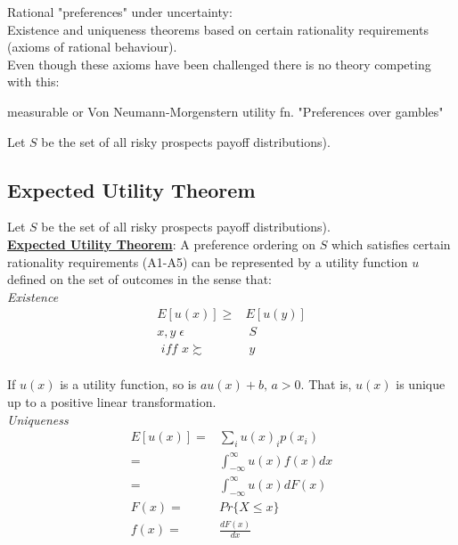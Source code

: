\documentclass[
14pt,notheorems,hyperref={pdfauthor=whatever}
]{beamer}
\begin{document}
\begin{frame}
Rational "preferences" under uncertainty:\\
\hfill \break
Existence and uniqueness theorems based on certain rationality requirements (axioms of rational behaviour).\\
\hfill \break
Even though these axioms have been challenged there is no theory competing with this:\\
\begin{outline}
    \1 measurable or Von Neumann-Morgenstern utility fn.
      \2 "Preferences over gambles"
\end{outline}
\hfill \break
Let $S$ be the set of all risky prospects  payoff distributions).\\
\end{frame}

\subsection{Expected Utility Theorem}

\begin{frame}
Let $S$ be the set of all risky prospects  payoff distributions).\\
\hfill \break
\underline{\textbf{Expected Utility Theorem}}: A preference ordering on $S$ which satisfies certain rationality requirements (A1-A5) can be represented by a utility function $u$ defined on the set of outcomes in the sense that:\\
\hfill \break
\textit{Existence}
\begin{align*}
    E[u(x)] \geq& E[u(y)]\\
    x, y \; \epsilon& \; S\\
    \textit{ iff } x \succsim & \; y\\
\end{align*}
\end{frame}

\begin{frame}
If $u(x)$ is a utility function, so is $au(x)+b\textit{, }a>0$. That is, $u(x)$ is unique up to a positive linear transformation. \\
\hfill \break
\textit{Uniqueness}
\begin{align*}
    E[u(x)] =& \sum_i u(x)_i p(x_i)\\
    =& \int_{-\infty}^\infty u(x)f(x)dx\\
    =& \int_{-\infty}^\infty u(x)dF(x)\\
    F(x) =& Pr\{X \leq x\}\\
    f(x) =& \frac{dF(x)}{dx}\\
\end{align*}
\end{frame}
\end{document}

